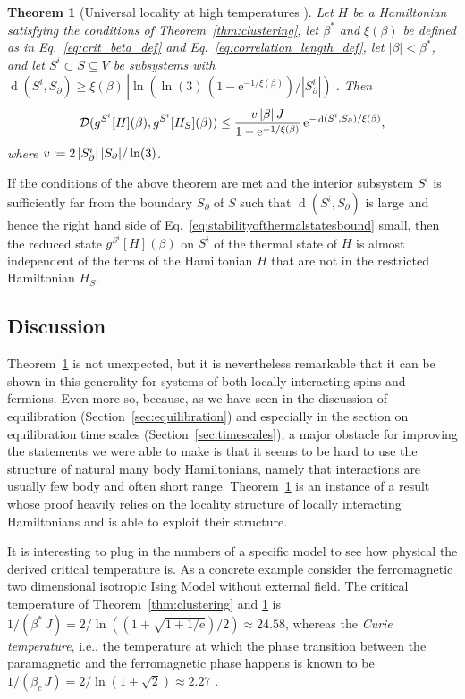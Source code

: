 \documentclass[a4paper,12pt,listof=totoc,index=totoc,bibliography=totoc,headsepline=false,headings=normal,BCOR16.153846mm,DIV12,headinclude,twoside,cleardoublepage=empty,numbers=noenddot,final]{scrreprt}
\theoremstyle{mystyle}
\numberwithin{equation}{section}
\numberwithin{figure}{section}
\numberwithin{lemma}{section}
\newtheorem{theorem}{Theorem}
\numberwithin{theorem}{section}
\numberwithin{corollary}{section}
\numberwithin{definition}{section}
\numberwithin{conjecture}{section}
\numberwithin{observation}{section}
\newcommand{\+}{\mkern2mu}
\newcommand{\coloneqq}{\mathrel{\vcentcolon\mkern-1.2mu=}} %
\newcommand{\texteqref}[1]{Eq.~\eqref{#1}}
\renewcommand{\H}{H}
\newcommand{\rhog}{g}
\newcommand{\tracedistance}[3][]{
  \ifthenelse{\equal{#2}{}}
  {\ifthenelse{\equal{#3}{}}
    {\mathcal{D}_{#1}}{}
  }{
    \ifthenelse{\equal{#1}{}}
    {\operatorname{\mathcal{D}}(#2,#3)}
    {\operatorname{\mathcal{D}}_{#1}(#2,#3)}
  }
}
\newcommand{\e}{\mathrm{e}}
\DeclareMathOperator{\1}{\mathds{1}}
\DeclareMathOperator{\dist}{d}
\begin{document}
\begin{theorem}[Universal locality at high temperatures {\cite[Theorem~4 and 17]{Kliesch2013a}}]\label{thm:intensivity}
  Let $\H$ be a Hamiltonian satisfying the conditions of Theorem~\ref{thm:clustering},
  let $\beta^\ast$ and $\xi(\beta)$ be defined as in \texteqref{eq:crit_beta_def} and \texteqref{eq:correlation_length_def},
  let $|\beta|< \beta^\ast$, and let $S^i \subset S \subseteq V$ be subsystems with
  $\dist(S^i, S_\partial) \geq \xi(\beta)\, \left|\ln\left(\ln(3)\, (1-\e^{-1/\xi(\beta)})/|S^i_\partial|\right)\right|$.
  Then
  \begin{equation}\label{eq:stabilityofthermalstatesbound}
    \tracedistance{\rhog^{S^i}[\H](\beta)}{\rhog^{S^i}[H_S](\beta)} \leq \frac{ v\, |\beta|\, J }{1-\e^{-1/\xi(\beta)}}\,\e^{- \dist(S^i, S_\partial) /\xi(\beta)} ,
  \end{equation}
  where $v \coloneqq 2\, |S^i_\partial|\,|S_\partial|/\ln(3)$.
\end{theorem}

If the conditions of the above theorem are met and the interior subsystem $S^i$ is sufficiently far from the boundary $S_\partial$ of $S$ such that $\dist(S^i, S_\partial)$ is large and hence the right hand side of \texteqref{eq:stabilityofthermalstatesbound} small, then the reduced state $\rhog^{S^i}[\H](\beta)$ on $S^i$ of the thermal state of $\H$ is almost independent of the terms of the Hamiltonian $\H$ that are not in the restricted Hamiltonian $\H_S$.


\subsection*{Discussion}
%
Theorem~\ref{thm:intensivity} is not unexpected, but it is nevertheless remarkable that it can be shown in this generality for systems of both locally interacting spins and fermions.
Even more so, because, as we have seen in the discussion of equilibration (Section~\ref{sec:equilibration}) and especially in the section on equilibration time scales (Section~\ref{sec:timescales}), a major obstacle for improving the statements we were able to make is that it seems to be hard to use the structure of natural many body Hamiltonians, namely that interactions are usually few body and often short range.
Theorem~\ref{thm:intensivity} is an instance of a result whose proof heavily relies on the locality structure of locally interacting Hamiltonians and is able to exploit their structure.

It is interesting to plug in the numbers of a specific model to see how physical the derived critical temperature is.
As a concrete example consider the ferromagnetic two dimensional isotropic Ising Model without external field.
The critical temperature of Theorem~\ref{thm:clustering} and \ref{thm:intensivity} is
$1/(\beta^\ast\,J) = 2/\ln((1+\sqrt{1+1/\e})/2) \approx 24.58$, whereas the \emph{Curie temperature}, i.e., the temperature at which the phase transition between the paramagnetic and the ferromagnetic phase happens is known to be
$1/(\beta_c\,J) = 2/\ln(1+\sqrt{2}) \approx 2.27$ \cite{Bhattacharjee1995}.
\end{document}
